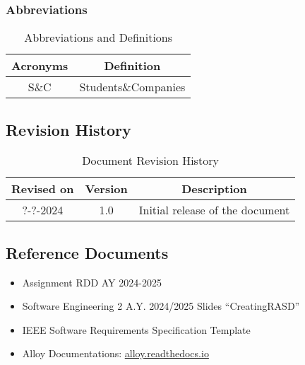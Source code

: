 \subsubsection{Abbreviations}
\begin{table}[h]
    \centering
\begin{tabular}{|c|c|}
        \hline
        \textbf{Acronyms} & \textbf{Definition} \\ \hline
        S\&C & Students\&Companies \\ \hline
    \end{tabular}
    \caption{Abbreviations and Definitions}
    \label{tab:abbreviations}
\end{table}

\subsection{Revision History}
\begin{table}[h]
    \centering
    \begin{tabular}{|c|c|c|}
        \hline
        \textbf{Revised on} & \textbf{Version} & \textbf{Description}\\ \hline
        ?-?-2024 & 1.0     & Initial release of the document \\ \hline
    \end{tabular}
    \caption{Document Revision History}
    \label{tab:revision_history_table}
\end{table}

\subsection{Reference Documents}
\begin{itemize}
  \item Assignment RDD AY 2024-2025
  \item Software Engineering 2 A.Y. 2024/2025 Slides “CreatingRASD”
  \item IEEE Software Requirements Specification Template
  \item Alloy Documentations: \url{alloy.readthedocs.io}
\end{itemize}


